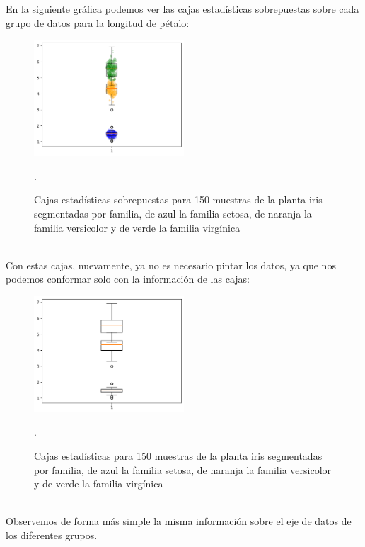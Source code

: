\documentclass{article}
\begin{document}
\clearpage

En la siguiente gráfica podemos ver las cajas estadísticas sobrepuestas sobre cada grupo de datos para la longitud de pétalo:
\begin{figure}[h]
    \centering
    \includegraphics[width=0.5\textwidth]{figures/box2.png}
    \captionsetup{width=0.8\textwidth}
    \caption{Cajas estadísticas sobrepuestas para 150 muestras de la planta iris segmentadas por familia, de azul la familia setosa, de naranja la familia versicolor y de verde la familia virgínica}.
    \label{fig:box2}
\end{figure}
\\
Con estas cajas, nuevamente, ya no es necesario pintar los datos, ya que nos podemos conformar solo con la información de las cajas:
\begin{figure}[h]
    \centering
    \includegraphics[width=0.5\textwidth]{figures/box3.png}
    \captionsetup{width=0.8\textwidth}
    \caption{Cajas estadísticas para 150 muestras de la planta iris segmentadas por familia, de azul la familia setosa, de naranja la familia versicolor y de verde la familia virgínica}.
    \label{fig:box3}
\end{figure}
\\
Observemos de forma más simple la misma información sobre el eje de datos de los diferentes grupos.

\clearpage
\end{document}
